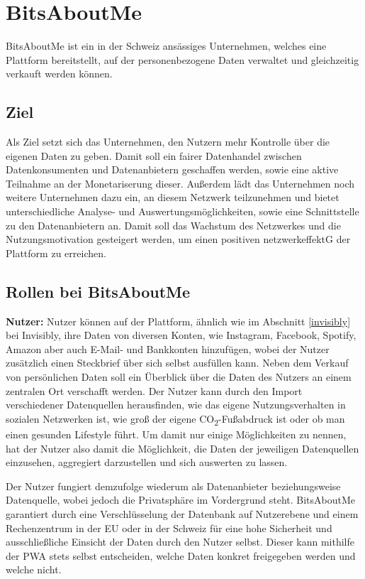 \section{BitsAboutMe}
BitsAboutMe ist ein in der Schweiz ansässiges Unternehmen, welches eine Plattform bereitstellt, auf der personenbezogene Daten verwaltet und gleichzeitig verkauft werden können.

\subsection{Ziel}
Als Ziel setzt sich das Unternehmen, den Nutzern mehr Kontrolle über die eigenen Daten zu geben. Damit soll ein fairer Datenhandel zwischen Datenkonsumenten und Datenanbietern geschaffen werden, sowie eine aktive Teilnahme an der Monetariserung dieser. Außerdem lädt das Unternehmen noch weitere Unternehmen dazu ein, an diesem Netzwerk teilzunehmen und bietet unterschiedliche Analyse- und Auswertungsmöglichkeiten, sowie eine Schnittstelle zu den Datenanbietern an. Damit soll das Wachstum des Netzwerkes und die Nutzungsmotivation gesteigert werden, um einen positiven \gls{netzwerkeffektG} der Plattform zu erreichen.

\subsection{Rollen bei BitsAboutMe}
\textbf{Nutzer:} Nutzer können auf der Plattform, ähnlich wie im Abschnitt \ref{invisibly} bei Invisibly, ihre Daten von diversen Konten, wie Instagram, Facebook, Spotify, Amazon aber auch E-Mail- und Bankkonten hinzufügen, wobei der Nutzer zusätzlich einen Steckbrief über sich selbst ausfüllen kann. Neben dem Verkauf von persönlichen Daten soll ein Überblick über die Daten des Nutzers an einem zentralen Ort verschafft werden. Der Nutzer kann durch den Import verschiedener Datenquellen herausfinden, wie das eigene Nutzungsverhalten in sozialen Netzwerken ist, wie groß der eigene CO\textsubscript{2}-Fußabdruck ist oder ob man einen gesunden Lifestyle führt. Um damit nur einige Möglichkeiten zu nennen, hat der Nutzer also damit die Möglichkeit, die Daten der jeweiligen Datenquellen einzusehen, aggregiert darzustellen und sich auswerten zu lassen. \newline

\noindent Der Nutzer fungiert demzufolge wiederum als Datenanbieter beziehungsweise Datenquelle, wobei jedoch die Privatsphäre im Vordergrund steht. BitsAboutMe garantiert durch eine Verschlüsselung der Datenbank auf Nutzerebene und einem Rechenzentrum in der EU oder in der Schweiz für eine hohe Sicherheit und ausschließliche Einsicht der Daten durch den Nutzer selbst. Dieser kann mithilfe der \gls{PWA} stets selbst entscheiden, welche Daten konkret freigegeben werden und welche nicht.\newline


